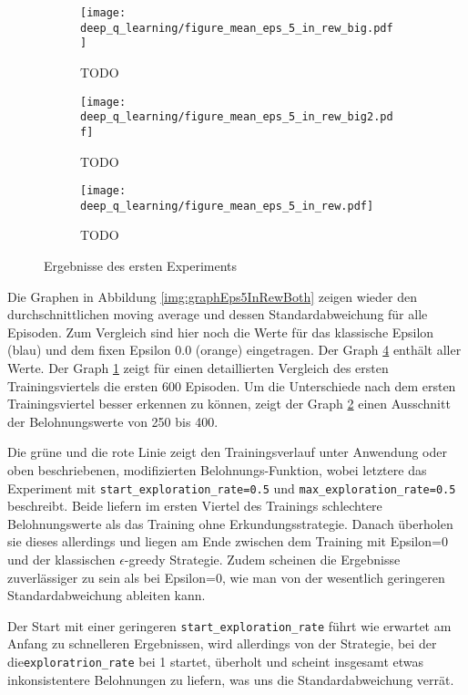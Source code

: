\begin{figure}[h!]
    \centering
    \begin{subfigure}[b]{0.49\textwidth}
        \texttt{[image: deep\_q\_learning/figure\_mean\_eps\_5\_in\_rew\_big.pdf]}
        \caption{TODO}
        \label{img:graphEps5InRewBig}
    \end{subfigure}
    \begin{subfigure}[b]{0.49\textwidth}
        \texttt{[image: deep\_q\_learning/figure\_mean\_eps\_5\_in\_rew\_big2.pdf]}
        \caption{TODO}
        \label{img:graphEps5InRewBig2}
    \end{subfigure}
    \begin{subfigure}[b]{0.7\textwidth}
        \texttt{[image: deep\_q\_learning/figure\_mean\_eps\_5\_in\_rew.pdf]}
        \caption{TODO}
        \label{img:graphEps5InRew}
    \end{subfigure}
    \caption{Ergebnisse des ersten Experiments}
\end{figure} \label{img:graphEps5InRewBoth}

Die Graphen in Abbildung \ref{img:graphEps5InRewBoth} zeigen wieder den durchschnittlichen moving average und dessen Standardabweichung für alle Episoden. Zum Vergleich sind hier noch die Werte für das klassische Epsilon (blau) und dem fixen Epsilon 0.0 (orange) eingetragen. Der Graph \ref{img:graphEps5InRew} enthält aller Werte. Der Graph \ref{img:graphEps5InRewBig} zeigt für einen detaillierten Vergleich des ersten Trainingsviertels die ersten 600 Episoden. Um die Unterschiede nach dem ersten Trainingsviertel besser erkennen zu können, zeigt der Graph \ref{img:graphEps5InRewBig2} einen Ausschnitt der Belohnungswerte von 250 bis 400.

Die grüne und die rote Linie zeigt den Trainingsverlauf unter Anwendung oder oben beschriebenen, modifizierten Belohnungs-Funktion, wobei letztere das Experiment mit \texttt{start_exploration_rate=0.5} und \texttt{max_exploration_rate=0.5} beschreibt. Beide liefern im ersten Viertel des Trainings schlechtere Belohnungswerte als das Training ohne Erkundungsstrategie. Danach überholen sie dieses allerdings und liegen am Ende zwischen dem Training mit Epsilon=0 und der klassischen $ \epsilon $-greedy Strategie. Zudem scheinen die Ergebnisse zuverlässiger zu sein als bei Epsilon=0, wie man von der wesentlich geringeren Standardabweichung ableiten kann.

Der Start mit einer geringeren \texttt{start_exploration_rate} führt wie erwartet am Anfang zu schnelleren Ergebnissen, wird allerdings von der Strategie, bei der die\linebreak\texttt{exploratrion_rate} bei 1 startet, überholt und scheint insgesamt etwas inkonsistentere Belohnungen zu liefern, was uns die Standardabweichung verrät.

